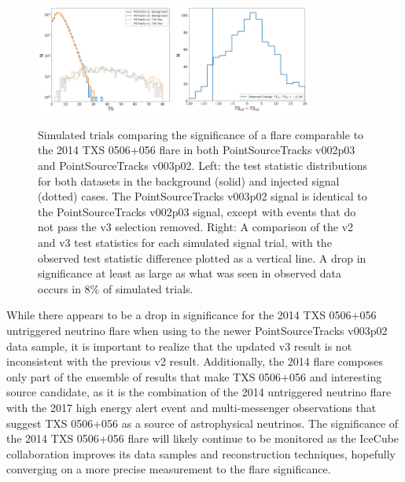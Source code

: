 \begin{figure}[h]
\centering
\includegraphics[width=0.4\textwidth]{figs/v2v3tsdists.png}
\includegraphics[width=0.4\textwidth]{figs/v2v3tsdiff.png}
\caption{Simulated trials comparing the significance of a flare comparable to the 2014 TXS 0506+056 flare in both PointSourceTracks v002p03 and PointSourceTracks v003p02. Left: the test statistic distributions for both datasets in the background (solid) and injected signal (dotted) cases. The PointSourceTracks v003p02 signal is identical to the PointSourceTracks v002p03 signal, except with events that do not pass the v3 selection removed. Right: A comparison of the v2 and v3 test statistics for each simulated signal trial, with the observed test statistic difference plotted as a vertical line. A drop in significance at least as large as what was seen in observed data occurs in 8\% of simulated trials.}
\label{fig:v2v3diff}
\end{figure}

While there appears to be a drop in significance for the 2014 TXS 0506+056 untriggered neutrino flare when using to the newer PointSourceTracks v003p02 data sample, it is important to realize that the updated v3 result is not inconsistent with the previous v2 result. Additionally, the 2014 flare composes only part of the ensemble of results that make TXS 0506+056 and interesting source candidate, as it is the combination of the 2014 untriggered neutrino flare with the 2017 high energy alert event and multi-messenger observations that suggest TXS 0506+056 as a source of astrophysical neutrinos. The significance of the 2014 TXS 0506+056 flare will likely continue to be monitored as the IceCube collaboration improves its data samples and reconstruction techniques, hopefully converging on a more precise measurement to the flare significance. 


